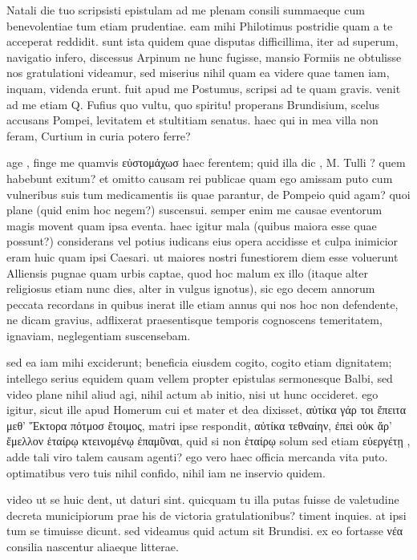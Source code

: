 


 Natali die tuo scripsisti epistulam ad me plenam consili summaeque cum benevolentiae tum etiam prudentiae. eam mihi Philotimus postridie quam a te acceperat reddidit. sunt ista quidem quae disputas difficillima, iter ad superum, navigatio infero, discessus Arpinum ne hunc fugisse, mansio Formiis ne obtulisse nos gratulationi videamur, sed miserius nihil quam ea videre quae tamen iam, inquam, videnda erunt. fuit apud me Postumus, scripsi ad te quam gravis. venit ad me etiam Q. Fufius quo vultu, quo spiritu! properans Brundisium, scelus accusans Pompei, levitatem et stultitiam senatus. haec qui in mea villa non feram, Curtium in curia potero ferre?

 age , finge me quamvis εὐστομάχωσ haec ferentem; quid illa dic , M. Tulli ? quem habebunt exitum? et omitto causam rei publicae quam ego amissam puto cum vulneribus suis tum medicamentis iis quae parantur, de Pompeio quid agam? quoi plane (quid enim hoc negem?) suscensui. semper enim me causae eventorum magis movent quam ipsa eventa. haec igitur mala (quibus maiora esse quae possunt?) considerans vel potius iudicans eius opera accidisse et culpa inimicior eram huic quam ipsi Caesari. ut maiores nostri funestiorem diem esse voluerunt Alliensis pugnae quam urbis captae, quod hoc malum ex illo (itaque alter religiosus etiam nunc dies, alter in vulgus ignotus), sic ego decem annorum peccata recordans in quibus inerat ille etiam annus qui nos hoc non defendente, ne dicam gravius, adflixerat praesentisque temporis cognoscens temeritatem, ignaviam, neglegentiam suscensebam.

 sed ea iam mihi exciderunt; beneficia eiusdem cogito, cogito etiam dignitatem; intellego serius equidem quam vellem propter epistulas sermonesque Balbi, sed video plane nihil aliud agi, nihil actum ab initio, nisi ut hunc occideret. ego igitur, sicut ille apud Homerum cui et mater et dea dixisset, αὐτίκα γάρ τοι ἔπειτα μεθ' Ἕκτορα πότμοσ ἕτοιμος, matri ipse respondit, αὐτίκα τεθναίην, ἐπεὶ οὐκ ἄρ' ἔμελλον ἑταίρῳ κτεινομένῳ ἐπαμῦναι, quid si non ἑταίρῳ solum sed etiam εὐεργέτῃ , adde tali viro talem causam agenti? ego vero haec officia mercanda vita puto. optimatibus vero tuis nihil confido, nihil iam ne inservio quidem.

 video ut se huic dent, ut daturi sint. quicquam tu illa putas fuisse de valetudine decreta municipiorum prae his de victoria gratulationibus? timent inquies. at ipsi tum se timuisse dicunt. sed videamus quid actum sit Brundisi. ex eo fortasse νέα consilia nascentur aliaeque litterae.
